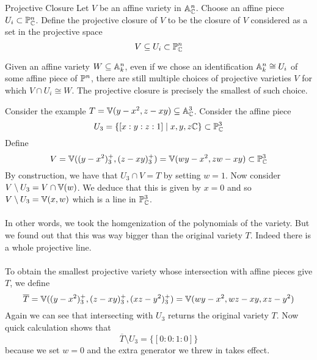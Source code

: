 \documentclass[a4paper]{article}
\begin{document}
\begin{defn}{Projective Closure}{} Let $V$ be an affine variety in $\mathbb{A}_{\mathbb{C}}^n$. Choose an affine piece $U_i\subset\mathbb{P}_{\mathbb{C}}^n$. Define the projective closure of $V$ to be the closure of $V$ considered as a set in the projective space $$V\subseteq U_i\subset\mathbb{P}_{\mathbb{C}}^n$$
\end{defn}

Given an affine variety $W\subseteq\mathbb{A}_k^n$, even if we chose an identification $\mathbb{A}_k^n\cong U_i$ of some affine piece of $\mathbb{P}^n$, there are still multiple choices of projective varieties $V$ for which $V\cap U_i\cong W$. The projective closure is precisely the smallest of such choice. 

\begin{eg}{}{} Consider the example $T=\mathbb{V}(y-x^2,z-xy)\subseteq\mathbb{A}_{\mathbb{C}}^3$. Consider the affine piece $$U_3=\{[x:y:z:1]\;|\;x,y,z\mathbb{C}\}\subset\mathbb{P}_{\mathbb{C}}^3$$ Define $$V=\mathbb{V}((y-x^2)_3^+,(z-xy)_3^+)=\mathbb{V}(wy-x^2,zw-xy)\subset\mathbb{P}_{\mathbb{C}}^3$$ By construction, we have that $U_3\cap V=T$ by setting $w=1$. Now consider $V\setminus U_3=V\cap\mathbb{V}(w)$. We deduce that this is given by $x=0$ and so $V\setminus U_3=\mathbb{V}(x,w)$ which is a line in $\mathbb{P}_{\mathbb{C}}^3$. \\~\\

In other words, we took the homgenization of the polynomials of the variety. But we found out that this was way bigger than the original variety $T$. Indeed there is a whole projective line. \\~\\

To obtain the smallest projective variety whose intersection with affine pieces give $T$, we define $$\overline{T}=\mathbb{V}((y-x^2)_3^+,(z-xy)_3^+,(xz-y^2)_3^+)=\mathbb{V}(wy-x^2,wz-xy,xz-y^2)$$ Again we can see that intersecting with $U_3$ returns the original variety $T$. Now quick calculation shows that $$\overline{T}\setminus U_3=\{[0:0:1:0]\}$$ because we set $w=0$ and the extra generator we threw in takes effect. 
\end{eg}
\end{document}
